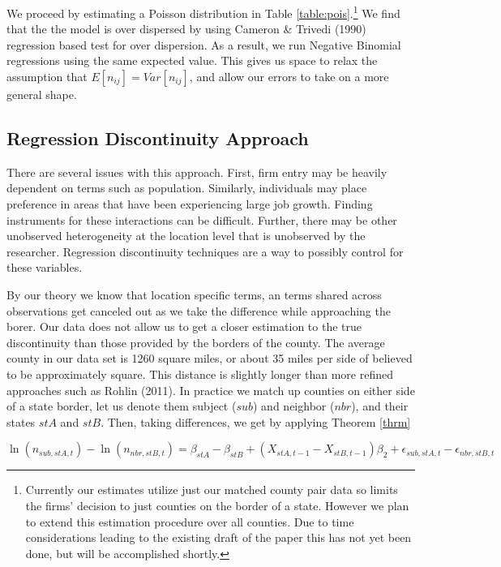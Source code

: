 We proceed by estimating a Poisson distribution in Table \ref{table:pois}.\footnote{Currently our estimates utilize just our matched county pair data so limits the firms' decision to just counties on the border of a state. However we plan to extend this estimation procedure over all counties. Due to time considerations leading to the existing draft of the paper this has not yet been done, but will be accomplished shortly.} We find that the the model is over dispersed by using Cameron \& Trivedi (1990) regression based test for over dispersion. As a result, we run Negative Binomial regressions using the same expected value. This gives us space to relax the assumption that $E[n_{ij}] = Var[n_{ij}]$, and allow our errors to take on a more general shape.

\subsection{Regression Discontinuity Approach}

There are several issues with this approach. First, firm entry may be heavily dependent on terms such as population. Similarly, individuals may place preference in areas that have been experiencing large job growth. Finding instruments for these interactions can be difficult. Further, there may be other unobserved heterogeneity at the location level that is unobserved by the researcher. Regression discontinuity techniques are a way to possibly control for these variables.

By our theory we know that location specific terms, an terms shared across observations get canceled out as we take the difference while approaching the borer. Our data does not allow us to get a closer estimation to the true discontinuity than those provided by the borders of the county. The average county in our data set is 1260 square miles, or about 35 miles per side of believed to be approximately square. This distance is slightly longer than more refined approaches such as Rohlin (2011). In practice we match up counties on either side of a state border, let us denote them subject ($sub$) and neighbor ($nbr$), and their states $stA$ and $stB$. Then, taking differences, we get by applying Theorem \ref{thrm}

\begin{equation}
\ln(n_{sub,stA,t})-\ln(n_{nbr,stB,t}) = \beta_{stA}-\beta_{stB}+(X_{stA,t-1}-X_{stB,t-1})\beta_{2} + \epsilon_{sub,stA,t}-\epsilon_{nbr,stB,t}
\end{equation}

